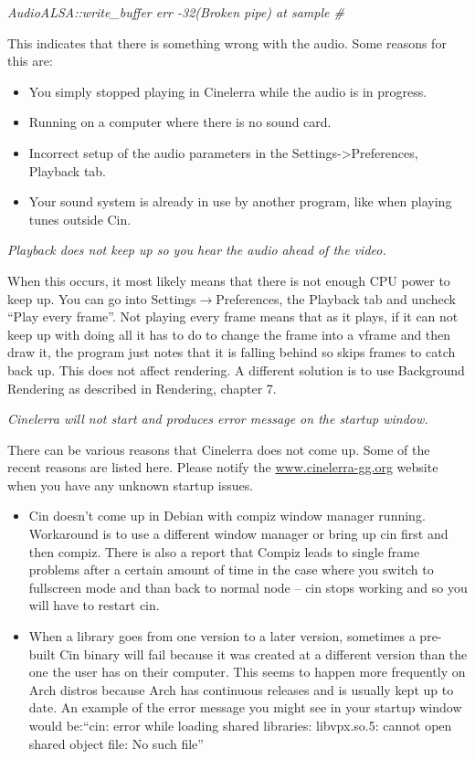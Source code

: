 \textit{AudioALSA::write\_buffer err -32(Broken pipe) at sample \#}
\medskip

This indicates that there is something wrong with the audio. Some reasons for this are:
\begin{itemize}[nosep]
	\item You simply stopped playing in Cinelerra while the audio is in progress.
	\item Running on a computer where there is no sound card.
	\item Incorrect setup of the audio parameters in the Settings-{\textgreater}Preferences, Playback tab.
	\item Your sound system is already in use by another program, like when playing {\textquotedbl}tunes{\textquotedbl} outside Cin.
\end{itemize}
\bigskip

\textit{Playback does not keep up so you hear the audio ahead of the video.}
\medskip

When this occurs, it most likely means that there is not enough CPU power to keep up. You can go into Settings$\rightarrow$Preferences, the Playback tab and uncheck ``Play every frame''. Not playing every frame means that as it plays, if it can not keep up with doing all it has to do to change the frame into a vframe and then draw it, the program just notes that it is falling behind so skips frames to catch back up. This does not affect rendering. A different solution is to use Background Rendering as described in Rendering, chapter 7.
\bigskip

\textit{Cinelerra will not start and produces error message on the startup window.}
\medskip

There can be various reasons that Cinelerra does not come up. Some of the recent reasons are listed here. Please notify the \href{http://www.cinelerra-gg.org/}{www.cinelerra-gg.org} website when you have any unknown startup issues.
\medskip

\begin{itemize}[nosep]
	\item Cin doesn't come up in Debian with compiz window manager running. Workaround is to use a different window manager or bring up cin first and then compiz. There is also a report that Compiz leads to single frame problems after a certain amount of time in the case where you switch to fullscreen mode and than back to normal node -- cin stops working and so you will have to restart cin.
	\item When a library goes from one version to a later version, sometimes a pre-built Cin binary will fail because it was created at a different version than the one the user has on their computer. This seems to happen more frequently on Arch distros because Arch has continuous releases and is usually kept up to date. An example of the error message you might see in your startup window would be:\newline``cin: error while loading shared libraries: libvpx.so.5: cannot open shared object file: No such file''
\end{itemize}
\medskip

